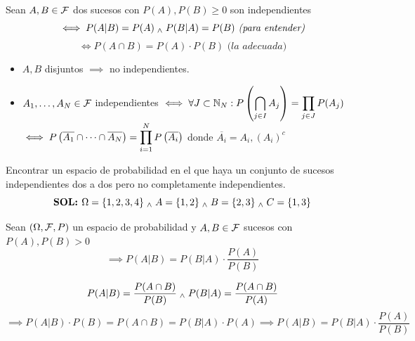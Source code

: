 \begin{defn}[Independencia]
	Sean $A,B \in \mathcal{F}$ dos sucesos con $P(A), P(B) \geq 0$ son independientes
	\[\iff P(A|B) = P(A) \; _{\wedge} \; P(B|A)=P(B) \textit{ (para entender)}\]
	\[\iff P(A\cap B)=P(A)\cdot P(B) \textit{ (la adecuada)}\]
	\begin{itemize}[topsep=1pt, itemsep=1pt,parsep=3pt]
		\item $A, B$ disjuntos $\implies$ no independientes.
		\item $A_1, \dots, A_N \in \mathcal{F}$ independientes $\displaystyle \iff \forall J \subset \mathbb{N}_N: P\left(\bigcap_{j\in I} A_j\right)=\prod_{j\in J}P(A_j)$ \\
		      $\displaystyle \iff P\left(\overline{A_1}\cap\cdots\cap\overline{A_N}\right)=\prod_{i=1}^N P\left(\overline{A_i}\right)$ donde $\overline{A_i}=A_i, (A_i)^c$
	\end{itemize}
\end{defn}
\begin{ejer}
	Encontrar un espacio de probabilidad en el que haya un conjunto de sucesos independientes dos a dos pero no completamente independientes.
	\[\textbf{SOL: }\Omega = \{1, 2, 3, 4\} \; _{\wedge} \; A=\{1, 2\} \; _{\wedge} \; B=\{2, 3\} \; _{\wedge} \; C=\{1,3\}\]
\end{ejer}

\begin{prop}
	Sean $(\Omega, \mathcal{F}, P)$ un espacio de probabilidad y $A, B \in \mathcal{F}$ sucesos con $P(A), P(B)>0$
	\[\implies P(A|B)=P(B|A)\cdot \frac{P(A)}{P(B)}\]
	\begin{dem}
		\[P(A|B)=\frac{P(A\cap B)}{P(B)} \; _{\wedge} \; P(B|A)=\frac{P(A\cap B)}{P(A)}\]
		\[\implies P(A|B)\cdot P(B) = P(A\cap B) = P(B|A)\cdot P(A) \implies P(A|B)=P(B|A)\cdot \frac{P(A)}{P(B)}\]
	\end{dem}
\end{prop}

